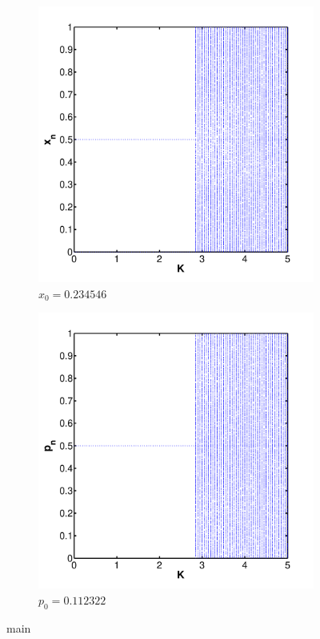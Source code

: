 \begin{figure}[h!]
	\centering
	\begin{subfigure}{\columnwidth}
		\centering
			\includegraphics[width=\textwidth]{./img/assignment_b_dim_0_b_x}
			\caption{$x_0 = \num{0.234546}$}
			\label{fig:experiment:bifurcation:x}
	\end{subfigure}
	\begin{subfigure}{\columnwidth}
		\centering
			\includegraphics[width=\textwidth]{./img/assignment_b_dim_0_b_p}
			\caption{$p_0 = \num{0.112322}$}
			\label{fig:experiment:bifurcation:p}
	\end{subfigure}
	\caption{main}
	\label{fig:experiment:bifurcation}
\end{figure}

